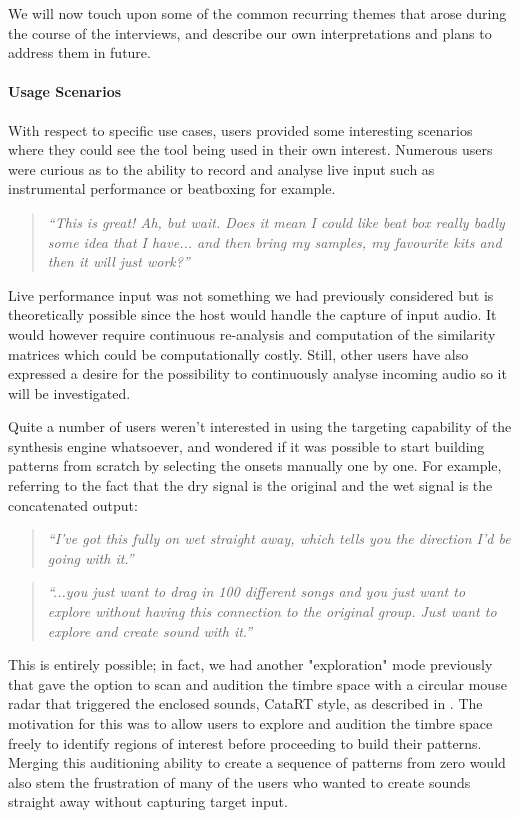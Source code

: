 We will now touch upon some of the common recurring themes that arose during the course of the interviews, and describe our own interpretations and plans to address them in future.

\paragraph{Usage Scenarios}

With respect to specific use cases, users provided some interesting scenarios where they could see the tool being used in their own interest. Numerous users were curious as to the ability to record and analyse live input such as instrumental performance or beatboxing for example.

\blockquote{\textit{“This is great! Ah, but wait. Does it mean I could like beat box really badly some idea that I have... and then bring my samples, my favourite kits and then it will just work?”}}

Live performance input was not something we had previously considered but is theoretically possible since the host would handle the capture of input audio. It would however require continuous re-analysis and computation of the similarity matrices which could be computationally costly. Still, other users have also expressed a desire for the possibility to continuously analyse incoming audio so it will be investigated.

Quite a number of users weren't interested in using the targeting capability of the synthesis engine whatsoever, and wondered if it was possible to start building patterns from scratch by selecting the onsets manually one by one. For example, referring to the fact that the dry signal is the original and the wet signal is the concatenated output:

\blockquote{\textit{ “I've got this fully on wet straight away, which tells you the direction I'd be going with it.”}}

\blockquote{\textit{“...you just want to drag in 100 different songs and you just want to explore without having this connection to the original group. Just want to explore and create sound with it.”}}

This is entirely possible; in fact, we had another "exploration" mode previously that gave the option to scan and audition the timbre space with a circular mouse radar that triggered the enclosed sounds, CataRT style, as described in . The motivation for this was to allow users to explore and audition the timbre space freely to identify regions of interest before proceeding to build their patterns. Merging this auditioning ability to create a sequence of patterns from zero would  also stem the frustration of many of the users who wanted to create sounds straight away without capturing target input.

